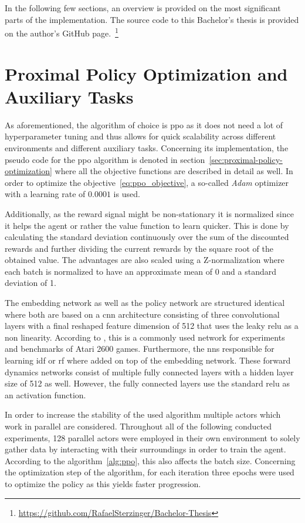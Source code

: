 \documentclass[draft,final]{vutinfth} %
\begin{document}
    In the following few sections, an overview is provided on the most significant parts of the implementation.
    The source code to this Bachelor's thesis is provided on the author's GitHub page.~\footnote{\url{https://github.com/RafaelSterzinger/Bachelor-Thesis}}


    \section{Proximal Policy Optimization and Auxiliary Tasks}

    As aforementioned, the algorithm of choice is \gls{ppo} as it does not need a lot of hyperparameter tuning and thus allows for quick scalability across different environments and different auxiliary tasks.
    Concerning its implementation, the pseudo code for the \gls{ppo} algorithm is denoted in section~\ref{sec:proximal-policy-optimization} where all the objective functions are described in detail as well.
    In order to optimize the objective~\ref{eq:ppo_objective}, a so-called \textit{Adam} optimizer with a learning rate of $0.0001$ is used.

    Additionally, as the reward signal might be non-stationary it is normalized since it helps the agent or rather the value function to learn quicker.
    This is done by calculating the standard deviation continuously over the sum of the discounted rewards and further dividing the current rewards by the square root of the obtained value.
    The advantages are also scaled using a Z-normalization where each batch is normalized to have an approximate mean of 0 and a standard deviation of 1.

    The embedding network as well as the policy network are structured identical where both are based on a \gls{cnn} architecture consisting of three convolutional layers with a final reshaped feature dimension of 512 that uses the leaky \gls{relu} as a non linearity.
    According to \citeauthor{burda_large-scale_2018-1}, this is a commonly used network for experiments and benchmarks of Atari 2600 games.
    Furthermore, the \glspl{nn} responsible for learning \gls{idf} or \gls{rf}  where added on top of the embedding network.
    These forward dynamics networks consist of multiple fully connected layers with a hidden layer size of 512 as well.
    However, the fully connected layers use the standard \gls{relu} as an activation function.

    In order to increase the stability of the used algorithm multiple actors which work in parallel are considered.
    Throughout all of the following conducted experiments, 128 parallel actors were employed in their own environment to solely gather data by interacting with their surroundings in order to train the agent.
    According to the algorithm~\ref{alg:ppo}, this also affects the batch size.
    Concerning the optimization step of the algorithm, for each iteration three epochs were used to optimize the policy as this yields faster progression.
\end{document}
